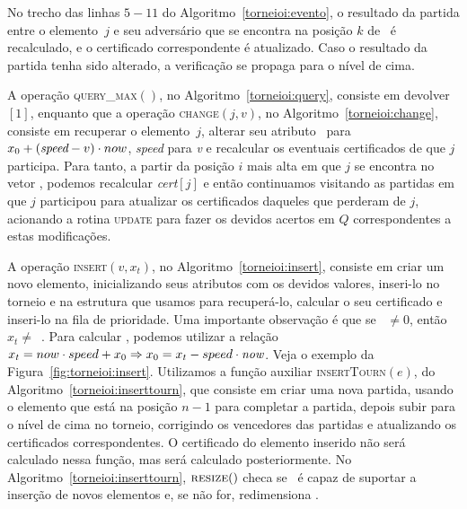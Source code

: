 No trecho das linhas $5 - 11$ do Algoritmo~\ref{torneioi:evento}, o resultado da partida entre o
elemento~$j$ e seu adversário que se encontra na posição $k$ de \torneio~é recalculado, e o
certificado correspondente é atualizado.
Caso o resultado da partida tenha sido alterado, a verificação se propaga para o nível de cima.





A operação \textsc{query\_max}$()$, no Algoritmo~\ref{torneioi:query}, consiste em devolver
\torneio$[1]$, enquanto que a operação \textsc{change}$(j, v)$, no
Algoritmo~\ref{torneioi:change}, consiste em recuperar o elemento~$j$, alterar seu atributo
\initv~para $x_0+(\textit{speed}-v)\cdot now$, \textit{speed} para \textit{v} e recalcular os eventuais
certificados de que $j$ participa.
Para tanto, a partir da posição $i$ mais alta em que $j$ se encontra no vetor \torneio, podemos
recalcular \textit{cert}$[j]$ e então continuamos visitando as partidas em que $j$ participou para
atualizar os certificados daqueles que perderam de $j$, acionando a rotina \textsc{update} para
fazer os devidos acertos em $Q$ correspondentes a estas modificações.

A operação \textsc{insert}$(v, x_t)$, no Algoritmo~\ref{torneioi:insert}, consiste em criar um
novo elemento, inicializando seus atributos com os devidos valores, inseri-lo no torneio e na
estrutura que usamos para recuperá-lo, calcular o seu certificado e inseri-lo na fila de
prioridade.
Uma importante observação é que se \now~$\neq 0$, então $x_t \neq$~\initv.
Para calcular \initv, podemos utilizar a relação $x_t = now\cdot speed + x_0 \Rightarrow x_0 = x_t
- speed\cdot\textit{now}$.
Veja o exemplo da Figura~\ref{fig:torneioi:insert}.
Utilizamos a função auxiliar \textsc{insertTourn}$(e)$, do Algoritmo~\ref{torneioi:inserttourn},
que consiste em criar uma nova partida, usando o elemento que está na posição $n-1$ para completar
a partida, depois subir para o nível de cima no torneio, corrigindo os vencedores das partidas e
atualizando os certificados correspondentes.
O certificado do elemento inserido não será calculado nessa função, mas será calculado
posteriormente.
No Algoritmo~\ref{torneioi:inserttourn}, $\textsc{resize}()$ checa se \torneio~é capaz de suportar
a inserção de novos elementos e, se não for, redimensiona \torneio.



